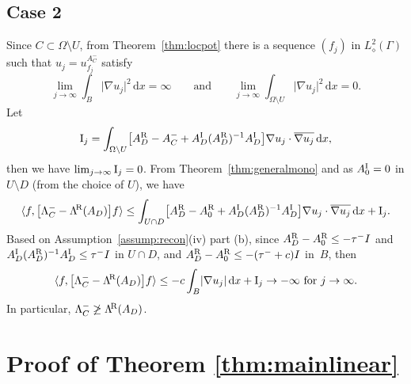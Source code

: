 \documentclass[reqno]{amsart}
\numberwithin{equation}{section}
\numberwithin{figure}{section}
\numberwithin{table}{section}
\theoremstyle{plain}
\theoremstyle{definition}
\theoremstyle{remark}
\newcommand{\abs}[1]{\lvert#1\rvert}
\newcommand{\inner}[1]{\langle#1\rangle}
\newcommand{\di}{\mathrm{d}}   %
\newcommand{\upR}{^{\textup{R}}}
\newcommand{\upI}{^{\textup{I}}}
\newcommand{\uptR}{^{\!\textup{R}}}
\newcommand{\LambdaR}{\Lambda\uptR}
\newcommand{\AR}{A\upR}
\newcommand{\AI}{A\upI}
\begin{document}
	\subsection*{Case 2}
	
	Since $C\subset \Omega\setminus U$, from Theorem~\ref{thm:locpot} there is a sequence $(f_j)$ in $L^2_\diamond(\Gamma)$ such that $u_j = u_{f_j}^{A_C^-}$ satisfy
	\begin{equation*}
		\lim_{j\to\infty} \int_B \abs{\nabla u_j}^2\,\di x = \infty \qquad \text{and} \qquad \lim_{j\to\infty}\int_{\Omega\setminus U} \abs{\nabla u_j}^2\,\di x = 0.
	\end{equation*}
	Let 
	\begin{equation*}
		\textup{I}_j = \int_{\Omega\setminus U} \bigl[ \AR_D - A_C^- + \AI_D(\AR_D)^{-1}\AI_D \bigr]\nabla u_j \cdot \overline{\nabla u_j}\,\di x,
	\end{equation*}
	then we have $\lim_{j\to\infty} \textup{I}_j = 0$. From Theorem~\ref{thm:generalmono} and as $\AI_0 = 0$ in $U\setminus D$ (from the choice of $U$), we have
	\begin{equation*}
		\inner{f,\bigl[ \Lambda_C^- - \LambdaR(A_D) \bigr]f} \leq \int_{U\cap D} \bigl[\AR_D - \AR_0 + \AI_D(\AR_D)^{-1}\AI_D\bigr]\nabla u_j\cdot\overline{\nabla u_j}\,\di x + \textup{I}_j.
	\end{equation*}
	Based on Assumption~\ref{assump:recon}(iv) part (b), since $\AR_D - \AR_0 \leq -\tau^- I$ and $\AI_D(\AR_D)^{-1}\AI_D \leq \tau^- I$ in $U\cap D$, and $\AR_D - \AR_0 \leq -(\tau^- + c) I$ in~$B$, then 
	\begin{equation*}
		\inner{f,\bigl[ \Lambda_C^- - \LambdaR(A_D) \bigr]f} \leq -c\int_B \abs{\nabla u_j}\,\di x + \textup{I}_j \to -\infty \text{ for } j\to\infty.
	\end{equation*}
	In particular, $\Lambda_C^- \not\geq \LambdaR(A_D)$.
	
	\section{Proof of Theorem \ref{thm:mainlinear}} \label{sec:proofmainlinear}
	
\end{document}
